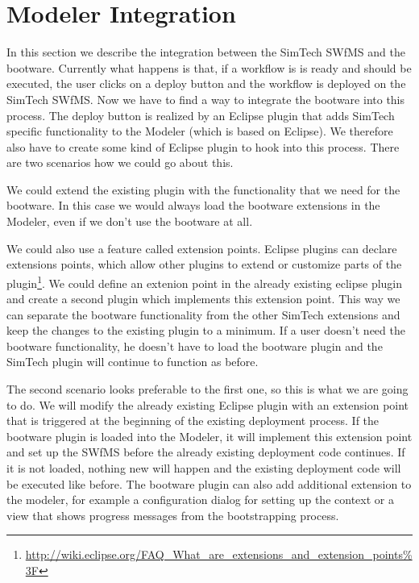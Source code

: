 \section{Modeler Integration}
\label{implementation:modeler_integration}

In this section we describe the integration between the SimTech SWfMS and the bootware.
Currently what happens is that, if a workflow is is ready and should be executed, the user clicks on a deploy button and the workflow is deployed on the SimTech SWfMS.
Now we have to find a way to integrate the bootware into this process.
The deploy button is realized by an Eclipse plugin that adds SimTech specific functionality to the Modeler (which is based on Eclipse).
We therefore also have to create some kind of Eclipse plugin to hook into this process.
There are two scenarios how we could go about this.

We could extend the existing plugin with the functionality that we need for the bootware.
In this case we would always load the bootware extensions in the Modeler, even if we don't use the bootware at all.

We could also use a feature called extension points.
Eclipse plugins can declare extensions points, which allow other plugins to extend or customize parts of the plugin\footnote{\url{http://wiki.eclipse.org/FAQ_What_are_extensions_and_extension_points\%3F}}.
We could define an extenion point in the already existing eclipse plugin and create a second plugin which implements this extension point.
This way we can separate the bootware functionality from the other SimTech extensions and keep the changes to the existing plugin to a minimum.
If a user doesn't need the bootware functionality, he doesn't have to load the bootware plugin and the SimTech plugin will continue to function as before.

The second scenario looks preferable to the first one, so this is what we are going to do.
We will modify the already existing Eclipse plugin with an extension point that is triggered at the beginning of the existing deployment process.
If the bootware plugin is loaded into the Modeler, it will implement this extension point and set up the SWfMS before the already existing deployment code continues.
If it is not loaded, nothing new will happen and the existing deployment code will be executed like before.
The bootware plugin can also add additional extension to the modeler, for example a configuration dialog for setting up the context or a view that shows progress messages from the bootstrapping process.

